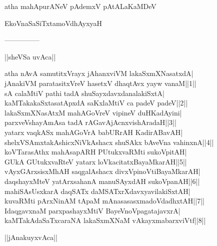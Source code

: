 \documentclass{article}
\begin{document}
\begin{center}
atha mahApurANeV pAdemxV pAtALaKaMDeV
\end{center}

\begin{center}
EkoVnaSaSiTxtamoVdhAyxyaH
\end{center}

\begin{center}
---------------
\end{center}

\begin{center}
||sheVSa uvAca||
\end{center}

atha nAvA samutitxVrayx jAhanxviVM lakaSxmXNasatxdA|\\
jAnakiVM paratasitxVreV hasetxV dhaqtAvx yayw vanaM||1||\\
sA calaMtiV pathi tadA shuSayxdavxdanalakiSxtA|\\
kaMTakakaSxtasatApxdA saKxlaMtiV ca padeV padeV||2||\\
lakaSxmXNasAtxM mahAGoVreV vipineV duHKadAyini|\\
parxveVshayAmAsa tadA rAGavAjAcnxvishAradaH||3||\\
yatarx vaqkASx mahAGoVrA babURrAH KadirABavAH|\\
shelxVSAmxtakAshicxNiVkAshacx shuSAkx bAveVna vahinxnA||4||\\
koVTarasAthx mahAsapARH PUtukxvaRMti sukoVpitAH|\\
GUkA GUtukxvaRteV yatarx loVkacitatxBayaMkarAH||5||\\
vAyxGArxsisxMhAH saqgalAshacx divxVpinoVtiBayaMkarAH|\\
daqshayxMteV yatArxsahanA manuSAyxdAH sukoVpanAH||6||\\
mahiSAsUsxkarA daqSATx daMSATxrXdavxyavilakiSxtAH|\\
kuvaRMti pArxNinAM tApaM mAnasasasxmadoVdadhxtAH||7||\\
IdaqgavxnaM parxpashayxMtiV BayeVnoVpagatajavxrA|\\
kaMTakAdaSaTxcaraNA lakaSxmXNaM vAkayxmabarxviVtf||8||\\

\begin{center}
||jAnakuyxvAca||
\end{center}
\end{document}
